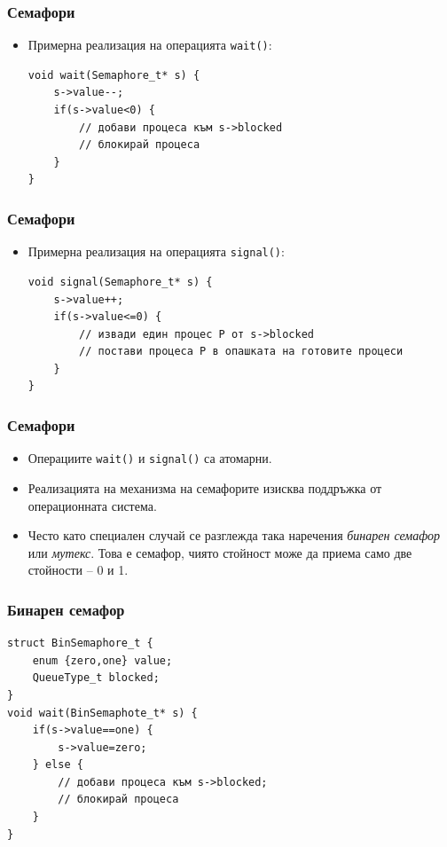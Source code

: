 \documentclass[ignorenonframetext, hyperref=unicode]{beamer}
\begin{document}
\begin{frame}[containsverbatim]
\frametitle{Семафори}
\begin{itemize}
\item Примерна реализация на операцията \lstinline{wait()}:
\begin{lstlisting}
void wait(Semaphore_t* s) {
	s->value--;
	if(s->value<0) {
		// добави процеса към s->blocked
		// блокирай процеса
	}
}
\end{lstlisting}
\end{itemize}
\end{frame}

\begin{frame}[containsverbatim]
\frametitle{Семафори}
\begin{itemize}
\item Примерна реализация на операцията \lstinline{signal()}:
\begin{lstlisting}
void signal(Semaphore_t* s) {
	s->value++;
	if(s->value<=0) {
		// извади един процес P от s->blocked
		// постави процеса P в опашката на готовите процеси
	}
}
\end{lstlisting}
\end{itemize}
\end{frame}

\begin{frame}[containsverbatim]
\frametitle{Семафори}
\begin{itemize}
\item Операциите \lstinline{wait()} и \lstinline{signal()} са атомарни.
\item Реализацията на механизма на семафорите изисква поддръжка от операционната
система.
\item Често като специален случай се разглежда така наречения 
{\em бинарен семафор} или {\em мутекс}. Това е семафор, чиято стойност може да
приема само две стойности -- 0 и 1.
\end{itemize}
\end{frame}


\begin{frame}[containsverbatim]
\frametitle{Бинарен семафор}
\begin{lstlisting}
struct BinSemaphore_t {
	enum {zero,one} value;
	QueueType_t blocked;
} 
void wait(BinSemaphote_t* s) {
	if(s->value==one) {
		s->value=zero;
	} else {
		// добави процеса към s->blocked;
		// блокирай процеса
	}
}
\end{lstlisting}
\end{frame}
\end{document}
